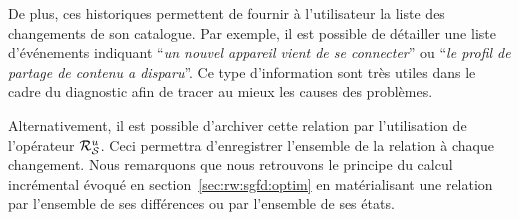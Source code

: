 De plus, ces historiques permettent de fournir à l'utilisateur la liste des changements de son catalogue. Par exemple, il est possible de détailler une liste d'événements indiquant \enquote{\it un nouvel appareil vient de se connecter} ou \enquote{\it le profil de partage de contenu a disparu}. Ce type d'information sont très utiles dans le cadre du diagnostic afin de tracer au mieux les causes des problèmes.

Alternativement, il est possible d'archiver cette relation par l'utilisation de l'opérateur $\mathcal{R}_{\mathcal S}^{u}$. Ceci permettra d'enregistrer l'ensemble de la relation à chaque changement. Nous remarquons que nous retrouvons le principe du calcul incrémental évoqué en section~\ref{sec:rw:sgfd:optim} en matérialisant une relation par l'ensemble de ses différences ou par l'ensemble de ses états.
